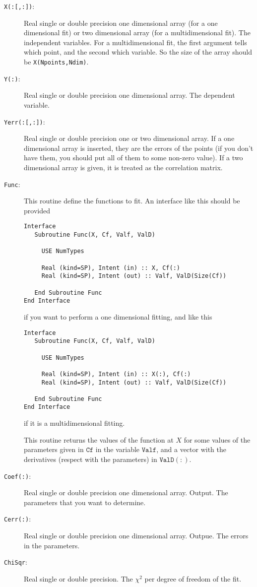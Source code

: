 \begin{description}
\item[\texttt{X(:[,:])}:] Real single or double precision one
  dimensional array (for a one dimensional fit) or two dimensional
  array (for a multidimensional fit). The
  independent variables. For a multidimensional fit, the first argument
  tells which point, and the second which variable. So the size of the
  array should be \texttt{X(Npoints,Ndim)}.
\item[\texttt{Y(:)}: ] Real single or double precision one dimensional
  array. The dependent
  variable.
\item[\texttt{Yerr(:[,:])}:] Real single or double precision one or
  two
  dimensional array. If a one dimensional array is inserted, they are
  the errors 
  of the points (if you don't have them, you should put all of them to
  some non-zero value). If a two dimensional array is given, it is
  treated as the correlation matrix.
\item[\texttt{Func}:] This routine define the functions to
  fit. An interface like this should be provided
\begin{verbatim}
Interface
   Subroutine Func(X, Cf, Valf, ValD)
         
     USE NumTypes

     Real (kind=SP), Intent (in) :: X, Cf(:)
     Real (kind=SP), Intent (out) :: Valf, ValD(Size(Cf))
         
   End Subroutine Func
End Interface
\end{verbatim}
if you want to perform a one dimensional fitting, and like this
\begin{verbatim}
Interface
   Subroutine Func(X, Cf, Valf, ValD)
        
     USE NumTypes

     Real (kind=SP), Intent (in) :: X(:), Cf(:)
     Real (kind=SP), Intent (out) :: Valf, ValD(Size(Cf))
         
   End Subroutine Func
End Interface
\end{verbatim}
if it is a multidimensional fitting. 

This routine returns the values of the function at $X$ for some values
of the parameters given in $\mathtt{Cf}$ in the variable
$\mathtt{Valf}$, and a vector with the derivatives (respect with the
parameters) in $\mathtt{ValD(:)}$. 
\item[\texttt{Coef(:)}: ] Real single or double precision one
  dimensional array. Output. The
  parameters that you want to determine.
\item[\texttt{Cerr(:)}:] Real single or double precision one
  dimensional array. Outpue. The errors
  in the parameters.
\item[\texttt{ChiSqr}: ] Real single or double precision. The $\chi^2$
  per degree of freedom of the fit.
\end{description}

